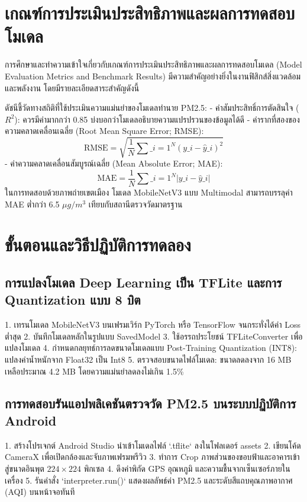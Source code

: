 \section{เกณฑ์การประเมินประสิทธิภาพและผลการทดสอบโมเดล}

การศึกษาและทำความเข้าใจเกี่ยวกับเกณฑ์การประเมินประสิทธิภาพและผลการทดสอบโมเดล (Model Evaluation Metrics and Benchmark Results) มีความสำคัญอย่างยิ่งในงานฟิสิกส์สิ่งแวดล้อมและพลังงาน โดยมีรายละเอียดสาระสำคัญดังนี้

ดัชนีชี้วัดทางสถิติที่ใช้ประเมินความแม่นยำของโมเดลทำนาย PM2.5:
- ค่าสัมประสิทธิ์การตัดสินใจ ($R^2$): ควรมีค่ามากกว่า 0.85 บ่งบอกว่าโมเดลอธิบายความแปรปรวนของข้อมูลได้ดี
- ค่ารากที่สองของความคลาดเคลื่อนเฉลี่ย (Root Mean Square Error; RMSE):
\[ \text{RMSE} = \sqrt{\frac{1}{N} \sum\_{i=1}^N (y\_i - \hat{y}\_i)^2} \]
- ค่าความคลาดเคลื่อนสัมบูรณ์เฉลี่ย (Mean Absolute Error; MAE):
\[ \text{MAE} = \frac{1}{N} \sum\_{i=1}^N |y\_i - \hat{y}\_i| \]
ในการทดสอบด้วยภาพถ่ายเขตเมือง โมเดล MobileNetV3 แบบ Multimodal สามารถบรรลุค่า MAE ต่ำกว่า 6.5 $\mu g/m^3$ เทียบกับสถานีตรวจวัดมาตรฐาน

\section{ขั้นตอนและวิธีปฏิบัติการทดลอง}

\subsection{การแปลงโมเดล Deep Learning เป็น TFLite และการ Quantization แบบ 8 บิต}
\begin{conceptbox}
1. เทรนโมเดล MobileNetV3 บนเฟรมเวิร์ก PyTorch หรือ TensorFlow จนกระทั่งได้ค่า Loss ต่ำสุด
2. บันทึกโมเดลหลักในรูปแบบ SavedModel
3. ใช้อรรถประโยชน์ TFLiteConverter เพื่อแปลงโมเดล
4. กำหนดกลยุทธ์การลดขนาดโมเดลแบบ Post-Training Quantization (INT8): แปลงค่าน้ำหนักจาก Float32 เป็น Int8
5. ตรวจสอบขนาดไฟล์โมเดล: ขนาดลดลงจาก 16 MB เหลือประมาณ 4.2 MB โดยความแม่นยำลดลงไม่เกิน 1.5\%
\end{conceptbox}

\subsection{การทดสอบรันแอปพลิเคชันตรวจวัด PM2.5 บนระบบปฏิบัติการ Android}
\begin{conceptbox}
1. สร้างโปรเจกต์ Android Studio นำเข้าโมเดลไฟล์ `.tflite` ลงในโฟลเดอร์ assets
2. เขียนโค้ด CameraX เพื่อเปิดกล้องและจับภาพเฟรมพรีวิว
3. ทำการ Crop ภาพส่วนของขอบฟ้าและอาคารเข้าสู่ขนาดอินพุต $224 \times 224$ พิกเซล
4. ดึงค่าพิกัด GPS อุณหภูมิ และความชื้นจากเซ็นเซอร์ภายในเครื่อง
5. รันคำสั่ง `interpreter.run()` แสดงผลลัพธ์ค่า PM2.5 และระดับสีแถบคุณภาพอากาศ (AQI) บนหน้าจอทันที
\end{conceptbox}

